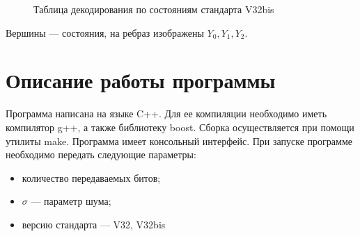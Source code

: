\documentclass[a4paper,12pt]{article}
\begin{document}
\begin{figure}
	\caption{Таблица декодирования по состояниям стандарта V32bis}
	\label{decodeV32}
\end{figure}

Вершины --- состояния, на ребраз изображены $Y_0, Y_1, Y_2$.

\section{Описание работы программы}
Программа написана на языке C++. Для ее компиляции необходимо иметь компилятор g++, а также библиотеку boost. Сборка
осуществляется при помощи утилиты make. Программа имеет консольный интерфейс. При запуске программе необходимо передать 
следующие параметры:
\begin{itemize}
	\item количество передаваемых битов;
	\item $\sigma$ --- параметр шума;
	\item версию стандарта --- V32, V32bis
\end{itemize}
\end{document}
